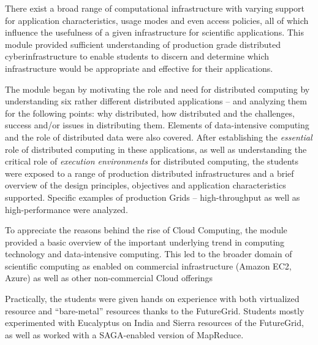 \documentclass[]{paper}
\begin{document}
There exist a broad range of computational infrastructure with varying
support for application characteristics, usage modes and even access
policies, all of which influence the usefulness of a given
infrastructure for scientific applications.  This module provided
sufficient understanding of production grade distributed
cyberinfrastructure to enable students to discern and determine which
infrastructure would be appropriate and effective for their
applications.

The module began by motivating the role and need for distributed
computing by understanding six rather different distributed
applications -- and analyzing them for the following points: why
distributed, how distributed and the challenges, success and/or issues
in distributing them. Elements of data-intensive computing and the
role of distributed data were also covered.  After establishing the
{\it essential} role of distributed computing in these applications,
as well as understanding the critical role of {\it execution
  environments} for distributed computing, the students were exposed
to a range of production distributed infrastructures and a brief
overview of the design principles, objectives and application
characteristics supported.  Specific examples of production Grids --
high-throughput as well as high-performance were analyzed.

To appreciate the reasons behind the rise of Cloud Computing, the
module provided a basic overview of the important underlying trend in
computing technology and data-intensive computing. This led to the
broader domain of scientific computing as enabled on commercial
infrastructure (Amazon EC2, Azure) as well as other non-commercial
Cloud offerings

 
Practically, the students were given hands on experience with both
virtualized resource and ``bare-metal'' resources thanks to the
FutureGrid. Students mostly experimented with Eucalyptus on India and
Sierra resources of the FutureGrid, as well as worked with a
SAGA-enabled version of MapReduce.
\end{document}
